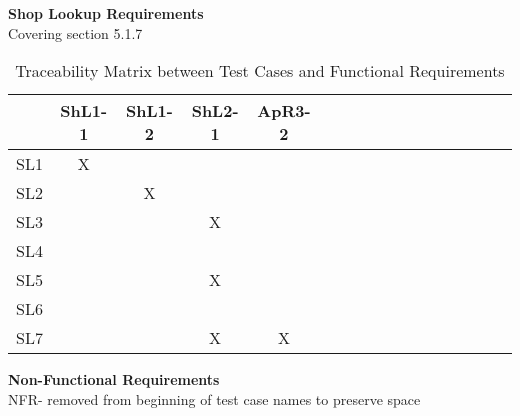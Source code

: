 \documentclass[12pt, titlepage]{article}
\begin{document}
\noindent \textbf{Shop Lookup Requirements}\\
Covering section 5.1.7
\begin{table}[H]
    \tiny
    \centering
    \begin{tabular}{|c|c|c|c|c|c|c|c|c|c|c|c|c|c|c|c|c|}
        \hline
        &     ShL1-1&ShL1-2&ShL2-1&ApR3-2\\\hline
        SL1 &     X&      &      &              \\ \hline
        SL2 &      &     X&      &               \\ \hline
        SL3 &      &      &     X&               \\ \hline
        SL4 &      &      &      &                \\ \hline
        SL5 &      &      &     X&               \\ \hline
        SL6 &      &      &      &                \\ \hline
        SL7 &      &      &     X&               X\\ \hline
    \end{tabular}
    \caption{Traceability Matrix between Test Cases and Functional Requirements}
\end{table}

\noindent \textbf{Non-Functional Requirements}\\
NFR- removed from beginning of test case names to preserve space\\
\end{document}

